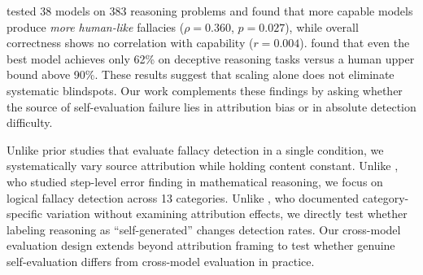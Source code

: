 \citet{richardson2025theory} tested 38 models on 383 reasoning problems and found that more capable models produce \emph{more human-like} fallacies ($\rho = 0.360$, $p = 0.027$), while overall correctness shows no correlation with capability ($r = 0.004$). \citet{zhai2025ruozhibench} found that even the best model achieves only 62\% on deceptive reasoning tasks versus a human upper bound above 90\%. These results suggest that scaling alone does not eliminate systematic blindspots. Our work complements these findings by asking whether the source of self-evaluation failure lies in attribution bias or in absolute detection difficulty.

Unlike prior studies that evaluate fallacy detection in a single condition, we systematically vary source attribution while holding content constant. Unlike \citet{tyen2024llms}, who studied step-level error finding in mathematical reasoning, we focus on logical fallacy detection across 13 categories. Unlike \citet{hong2024closer}, who documented category-specific variation without examining attribution effects, we directly test whether labeling reasoning as ``self-generated'' changes detection rates. Our cross-model evaluation design extends beyond attribution framing to test whether genuine self-evaluation differs from cross-model evaluation in practice.
